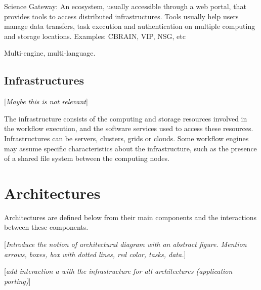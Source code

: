 \documentclass[preprint,3p,twocolumn]{elsarticle}
\newcommand{\todo}[1]{\color{blue}\xspace[\emph{#1}]\xspace\color{black}}
\begin{document}
Science Gateway: An ecosystem, usually accessible through a web
  portal, that provides tools to access distributed
  infrastructures. Tools usually help users manage data transfers,
  task execution and authentication on multiple computing and storage
  locations. Examples: CBRAIN, VIP, NSG, etc

Multi-engine, multi-language.


\subsection{Infrastructures}

\todo{Maybe this is not relevant}

The infrastructure consists of the computing and storage resources
involved in the workflow execution, and the software services used to
access these resources. Infrastructures can be servers, clusters,
grids or clouds. Some workflow engines may assume specific
characteristics about the infrastructure, such as the presence of a
shared file system between the computing nodes.

\section{Architectures}

Architectures are defined below from their main components and the
interactions between these components.


\todo{Introduce the notion of architectural diagram with an abstract
  figure. Mention arrows, boxes, box with dotted lines, red color,
  tasks, data.}

\todo{add interaction a with the infrastructure for all architectures (application porting)}

\end{document}
